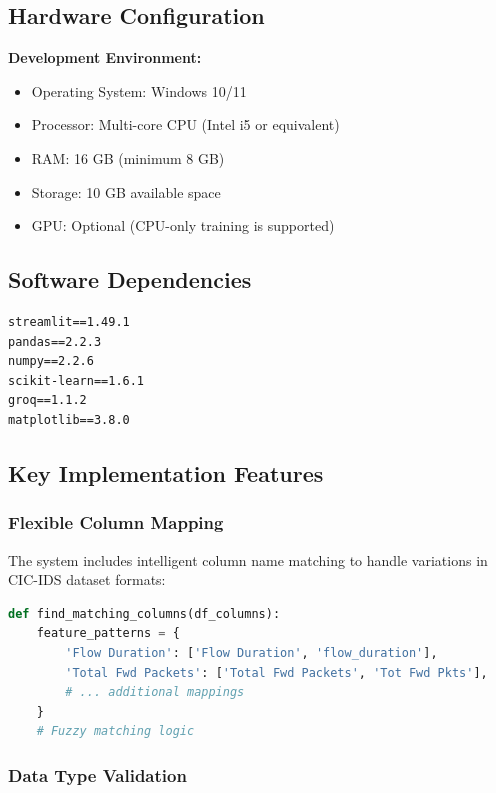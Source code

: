 \documentclass[12pt,a4paper]{article}
\begin{document}
\subsection{Hardware Configuration}

\textbf{Development Environment:}
\begin{itemize}
    \item Operating System: Windows 10/11
    \item Processor: Multi-core CPU (Intel i5 or equivalent)
    \item RAM: 16 GB (minimum 8 GB)
    \item Storage: 10 GB available space
    \item GPU: Optional (CPU-only training is supported)
\end{itemize}

\subsection{Software Dependencies}

\begin{lstlisting}
streamlit==1.49.1
pandas==2.2.3
numpy==2.2.6
scikit-learn==1.6.1
groq==1.1.2
matplotlib==3.8.0
\end{lstlisting}

\subsection{Key Implementation Features}

\subsubsection{Flexible Column Mapping}

The system includes intelligent column name matching to handle variations in CIC-IDS dataset formats:

\begin{lstlisting}[language=Python]
def find_matching_columns(df_columns):
    feature_patterns = {
        'Flow Duration': ['Flow Duration', 'flow_duration'],
        'Total Fwd Packets': ['Total Fwd Packets', 'Tot Fwd Pkts'],
        # ... additional mappings
    }
    # Fuzzy matching logic
\end{lstlisting}

\subsubsection{Data Type Validation}
\end{document}

